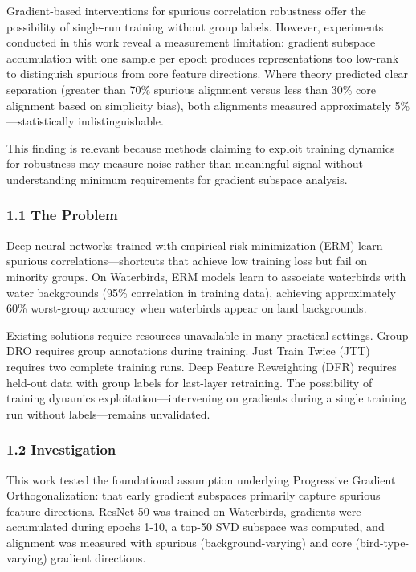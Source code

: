 
Gradient-based interventions for spurious correlation robustness offer the possibility of single-run training without group labels. However, experiments conducted in this work reveal a measurement limitation: gradient subspace accumulation with one sample per epoch produces representations too low-rank to distinguish spurious from core feature directions. Where theory predicted clear separation (greater than 70\% spurious alignment versus less than 30\% core alignment based on simplicity bias), both alignments measured approximately 5\%---statistically indistinguishable.

This finding is relevant because methods claiming to exploit training dynamics for robustness may measure noise rather than meaningful signal without understanding minimum requirements for gradient subspace analysis.

\subsubsection{1.1 The Problem}

Deep neural networks trained with empirical risk minimization (ERM) learn spurious correlations---shortcuts that achieve low training loss but fail on minority groups. On Waterbirds, ERM models learn to associate waterbirds with water backgrounds (95\% correlation in training data), achieving approximately 60\% worst-group accuracy when waterbirds appear on land backgrounds.

Existing solutions require resources unavailable in many practical settings. Group DRO requires group annotations during training. Just Train Twice (JTT) requires two complete training runs. Deep Feature Reweighting (DFR) requires held-out data with group labels for last-layer retraining. The possibility of training dynamics exploitation---intervening on gradients during a single training run without labels---remains unvalidated.

\subsubsection{1.2 Investigation}

This work tested the foundational assumption underlying Progressive Gradient Orthogonalization: that early gradient subspaces primarily capture spurious feature directions. ResNet-50 was trained on Waterbirds, gradients were accumulated during epochs 1-10, a top-50 SVD subspace was computed, and alignment was measured with spurious (background-varying) and core (bird-type-varying) gradient directions.

